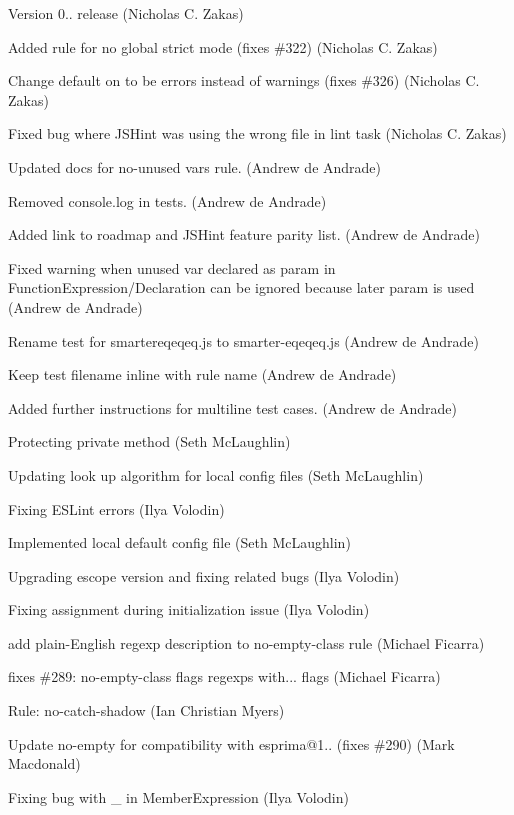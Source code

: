 \begin{DoxyItemize}
\item Version 0.. release (Nicholas C. Zakas)
\item Added rule for no global strict mode (fixes \#322) (Nicholas C. Zakas)
\item Change default on to be errors instead of warnings (fixes \#326) (Nicholas C. Zakas)
\item Fixed bug where J\+S\+Hint was using the wrong file in lint task (Nicholas C. Zakas)
\item Updated docs for no-\/unused vars rule. (Andrew de Andrade)
\item Removed console.\+log in tests. (Andrew de Andrade)
\item Added link to roadmap and J\+S\+Hint feature parity list. (Andrew de Andrade)
\item Fixed warning when unused var declared as param in Function\+Expression/\+Declaration can be ignored because later param is used (Andrew de Andrade)
\item Rename test for smartereqeqeq.\+js to smarter-\/eqeqeq.\+js (Andrew de Andrade)
\item Keep test filename inline with rule name (Andrew de Andrade)
\item Added further instructions for multiline test cases. (Andrew de Andrade)
\item Protecting private method (Seth Mc\+Laughlin)
\item Updating look up algorithm for local config files (Seth Mc\+Laughlin)
\item Fixing E\+S\+Lint errors (Ilya Volodin)
\item Implemented local default config file (Seth Mc\+Laughlin)
\item Upgrading escope version and fixing related bugs (Ilya Volodin)
\item Fixing assignment during initialization issue (Ilya Volodin)
\item add plain-\/\+English regexp description to no-\/empty-\/class rule (Michael Ficarra)
\item fixes \#289\+: no-\/empty-\/class flags regexps with... flags (Michael Ficarra)
\item Rule\+: no-\/catch-\/shadow (Ian Christian Myers)
\item Update no-\/empty for compatibility with esprima@1.. (fixes \#290) (Mark Macdonald)
\item Fixing bug with \+\_\+ in Member\+Expression (Ilya Volodin)

\end{DoxyItemize}
